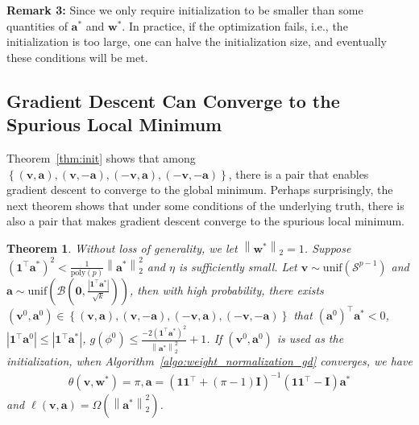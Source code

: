 \documentclass{article}
\newcommand{\poly}{\mathrm{poly}}
\newcommand{\unif}{\mathrm{unif}}
\newcommand{\firstlayer}{w}
\newcommand{\firstlayerWN}{v}
\newcommand{\secondlayer}{a}
\newcommand{\mat}[1]{\mathbf{#1}}
\newcommand{\vect}[1]{\mathbf{#1}}
\newcommand{\norm}[1]{\left\|#1\right\|}
\newcommand{\abs}[1]{\left|#1\right|}
\newtheorem{thm}{Theorem}[section]
\begin{document}
\noindent\textbf{Remark 3:} Since we only require initialization to be smaller than some quantities of $\vect{a}^*$ and $\vect{w}^*$. In practice, if the optimization fails, i.e., the initialization is too large, one can halve the initialization size, and eventually these conditions will be met.

\subsection{Gradient Descent Can Converge to the Spurious Local Minimum}
Theorem~\ref{thm:init} shows that among $\left\{\left(\vect{\firstlayerWN},\vect{\secondlayer}\right), \left(\vect{\firstlayerWN},-\vect{\secondlayer}\right), \left(-\vect{\firstlayerWN},\vect{\secondlayer}\right), \left(-\vect{\firstlayerWN},-\vect{\secondlayer}\right)  \right\}$, there is a  pair that enables gradient descent to converge to the global minimum.
Perhaps surprisingly, the next theorem shows that under some conditions of the underlying truth, there is also a pair that makes gradient descent converge to the spurious local minimum.

\begin{thm}\label{thm:w_norm_1_gd_converge_bad}
Without loss of generality, we let $\norm{\vect{\firstlayer}^*}_2=1$.
Suppose $\left(\vect{1}^\top \vect{\secondlayer}^*\right)^2 < \frac{1}{\poly(p)}\norm{\vect{\secondlayer}^*}_2^2$ and $\eta$ is sufficiently small.
Let $\vect{\firstlayerWN} \sim \unif\left(\mathcal{S}^{p-1}\right)$ and $\vect{\secondlayer} \sim \unif\left( \mathcal{B}\left(\vect{0},\frac{\abs{\vect{1}^\top\vect{\secondlayer}^*}}{\sqrt{k}}\right)\right)$, then with high probability, there exists $\left(\vect{\firstlayerWN}^0,\vect{\secondlayer}^0\right) \in \left\{\left(\vect{\firstlayerWN},\vect{\secondlayer}\right), \left(\vect{\firstlayerWN},-\vect{\secondlayer}\right), \left(-\vect{\firstlayerWN},\vect{\secondlayer}\right), \left(-\vect{\firstlayerWN},-\vect{\secondlayer}\right)  \right\}$ that $\left(\vect{\secondlayer}^0\right)^\top \vect{\secondlayer}^* < 0$, $\abs{ \vect{1}^\top\vect{\secondlayer}^0}\le \abs{\vect{1}^\top \vect{\secondlayer}^*}$, $g\left(\phi^0\right) \le  \frac{-2\left(\vect{1}^\top\vect{\secondlayer}^*\right)^2}{\norm{\vect{\secondlayer}^*}_2^2} + 1$.
If $\left(\vect{\firstlayerWN}^0,\vect{\secondlayer}^0\right)$ is used as the initialization, when  Algorithm~\ref{algo:weight_normalization_gd} converges, we have
\begin{align*}
\theta\left(\vect{\firstlayerWN},\vect{\firstlayer}^*\right) = \pi,
\vect{\secondlayer} = \left(\vect{1}\vect{1}^\top + \left(\pi-1\right)\mat{I}\right)^{-1}\left(\vect{1}\vect{1}^\top - \mat{I}\right)\vect{\secondlayer}^*
\end{align*} and
$\ell\left(\vect{\firstlayerWN},\vect{\secondlayer}\right) = \Omega\left(\norm{\vect{\secondlayer}^*}_2^2\right)$.
\end{thm}
\end{document}
